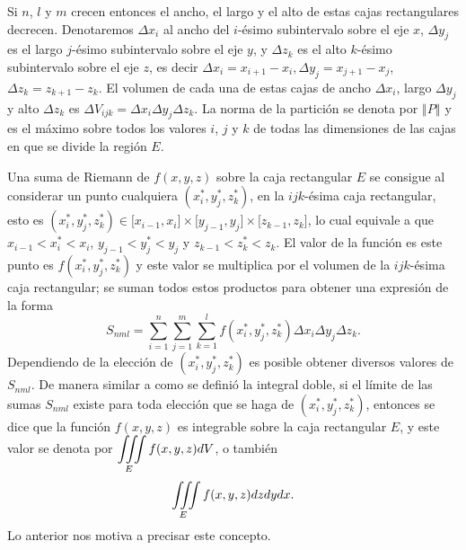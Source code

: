 Si $n$, $l$ y $m$ crecen entonces el ancho, el largo y el alto de estas
cajas rectangulares decrecen.
Denotaremos $\Delta x_{i}$ al ancho del $i$-ésimo subintervalo sobre el
eje $x$, $\Delta y_{j}$ es el largo $j$-ésimo subintervalo sobre el eje $y$, y $\Delta z_{k}$ es el alto $k$-ésimo subintervalo sobre el eje $z$, es decir $\Delta x_{i}=x_{i+1}-x_{i},\Delta y_{j}=x_{j+1}-x_{j}$, $\Delta
z_{k}=z_{k+1}-z_{k}$.
El volumen de cada una de estas cajas de ancho $\Delta x_{i}$, largo $\Delta y_{j}$ y alto $\Delta z_{k}$ es
$\Delta V_{ijk}=\Delta x_{i}\Delta y_{j}\Delta z_{k}$.
La norma de la partición se denota por $\left\Vert P\right\Vert $ y es
el máximo sobre todos los valores $i$, $j$ y $k$ de todas las
dimensiones de las cajas en que se divide la región $E$.

Una suma de Riemann de $f(x,y,z) $ sobre la caja rectangular $E$ se consigue al considerar un punto cualquiera
$\left( x_{i}^{\ast},y_{j}^{\ast },z_{k}^{\ast }\right) $, en la $ijk$-ésima caja
rectangular, esto es $\left( x_{i}^{\ast },y_{j}^{\ast },z_{k}^{\ast}\right) \in \lbrack x_{i-1},x_{i}]\times \lbrack y_{j-1},y_{j}]\times \lbrack z_{k-1},z_{k}]$, lo cual equivale a que $x_{i-1}<x_{i}^{\ast }<x_{i}$,
$y_{j-1}<y_{j}^{\ast }<y_{j}$ y $z_{k-1}<z_{k}^{\ast }<z_{k}$. El valor de la
función es este punto es $f\left( x_{i}^{\ast },y_{j}^{\ast},z_{k}^{\ast }\right) $
y este valor se multiplica por el volumen de la $ijk$-ésima caja rectangular; se suman todos estos productos para obtener
una expresión de la forma
\begin{equation*}
S_{nml}=\sum_{i=1}^{n}\sum_{j=1}^{m}\sum_{k=1}^{l}f\left( x_{i}^{\ast},y_{j}^{\ast },z_{k}^{\ast }\right) \Delta x_{i}\Delta y_{j}\Delta z_{k}.
\end{equation*}
Dependiendo de la elección de $\left( x_{i}^{\ast },y_{j}^{\ast },z_{k}^{\ast }\right)$
es posible obtener diversos valores de $S_{nml}$.
De manera similar a como se definió la integral doble, si el límite de
las sumas $S_{nml}$ existe para toda elección que se haga de
$\left(x_{i}^{\ast },y_{j}^{\ast },z_{k}^{\ast }\right)$, entonces se dice que la
función $f(x,y,z) $ es integrable sobre la caja rectangular $E$, y este valor se denota por
$\displaystyle\iiint\limits_{E}f(x,y,z) dV$, o también
$$\displaystyle \iiint\limits_{E}f(x,y,z) dzdydx.$$
Lo anterior nos motiva a precisar este concepto.

